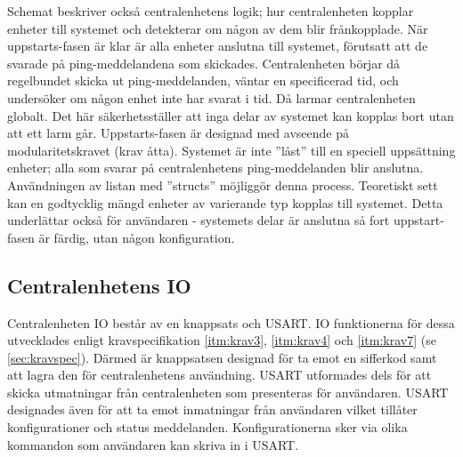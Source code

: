 \newline \newline
Schemat beskriver också centralenhetens logik; hur centralenheten kopplar enheter till systemet och detekterar om någon av dem blir frånkopplade. När uppstarts-fasen är klar är alla enheter anslutna till systemet, förutsatt att de svarade på ping-meddelandena som skickades. Centralenheten börjar då regelbundet skicka ut ping-meddelanden, väntar en specificerad tid, och undersöker om någon enhet inte har svarat i tid. Då larmar centralenheten globalt. Det här säkerhetsställer att inga delar av systemet kan kopplas bort utan att ett larm går.
\newline \newline
Uppstarts-fasen är designad med avseende på modularitetskravet (krav åtta). Systemet är inte ''låst'' till en speciell uppsättning enheter; alla som svarar på centralenhetens ping-meddelanden blir anslutna. Användningen av listan med ''structs'' möjliggör denna process. Teoretiskt sett kan en godtycklig mängd enheter av varierande typ kopplas till systemet. Detta underlättar också för användaren - systemets delar är anslutna så fort uppstart-fasen är färdig, utan någon konfiguration.

\subsection{Centralenhetens IO}
\label{sec:centralenhetIODE}
Centralenheten IO består av en knappsats och USART. IO funktionerna för dessa utvecklades enligt kravspecifikation \ref{itm:krav3}, \ref{itm:krav4} och \ref{itm:krav7} (se \ref{sec:kravspec}). Därmed är knappsatsen designad för ta emot en sifferkod samt att lagra den för centralenhetens användning. USART utformades dels för att skicka utmatningar från centralenheten som presenteras för användaren. USART designades även för att ta emot inmatningar från användaren vilket tillåter konfigurationer och status meddelanden. Konfigurationerna sker via olika kommandon som användaren kan skriva in i USART. \\


